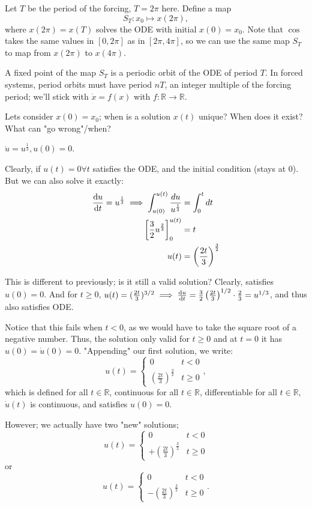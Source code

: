 \documentclass[12pt, oneside]{article}
\begin{document}
Let $T$ be the period of the forcing, $T = 2 \pi$ here. Define a map \[S_T: x_0 \mapsto x (2\pi),\] where $x(2 \pi) = x(T)$ solves the ODE with initial $x(0) = x_0$. Note that $\cos$ takes the same values in $[0, 2\pi]$ as in $[2\pi, 4\pi]$, so we can use the same map $S_T$ to map from $x(2 \pi)$ to $x(4 \pi)$.

A fixed point of the map $S_T$ is a periodic orbit of the ODE of period $T$. In forced systems, period orbits must have period $n T$, an integer multiple of the forcing period; we'll stick with $\dot{x} = f(x)$ with $f: \mathbb{R} \to \mathbb{R}$.

Lets consider $x(0) = x_0$; when is a solution $x(t)$ unique? When does it exist? What can "go wrong"/when?

\begin{example}\label{ex:bad1}
  $\dot{u} = u^{\frac{1}{3}}, u(0) = 0$. 
  
  Clearly, if $u(t) = 0 \forall t$ satisfies the ODE, and the initial condition (stays at 0). But we can also solve it exactly:
  \begin{align*}
    \dv{u}{t} = u^{\frac{1}{3}} \implies\int_{u(0)}^{u(t)} \frac{du}{u^{\frac{1}{3}}} &= \int_0^t dt\\
    \left[\frac{3}{2}u^{\frac{2}{3}}\right]_0^{u(t)} &= t\\
    u(t) &= \left(\frac{2t}{3}\right)^{\frac{3}{2}}
  \end{align*}

  This is different to previously; is it still a valid solution? Clearly, satisfies $u(0) = 0$. And for $t \geq 0$, $u(t) = (\frac{2t}{3})^{3/2} \implies \dv{u}{t} = \frac{3}{2}\left(\frac{2t}{3}\right)^{1/2}\cdot \frac{2}{3} = u^{1/3}$, and thus also satisfies ODE.

  Notice that this fails when $t < 0$, as we would have to take the square root of a negative number. Thus, the solution only valid for $t \geq 0$ and at $t = 0$ it has $u(0) = \dot{u}(0) = 0$. "Appending" our first solution, we write:
  \[u(t) = \begin{cases}
    0 & t < 0\\
    \left(\frac{2t}{3}\right)^{\frac{3}{2}} & t \geq 0
  \end{cases},\] which is defined for all $t \in \mathbb{R}$, continuous for all $t \in \mathbb{R}$, differentiable for all $t \in \mathbb{R}$, $\dot{u}(t)$ is continuous, and satisfies $u(0) = 0$.

  However; we actually have two "new" solutions; \[u(t) = \begin{cases}
    0 & t < 0\\
    +\left(\frac{2t}{3}\right)^{\frac{3}{2}} & t \geq 0
  \end{cases}\] or \[u(t) = \begin{cases}
    0 & t < 0\\
    -\left(\frac{2t}{3}\right)^{\frac{3}{2}} & t \geq 0
  \end{cases}.\]


\end{example}
\end{document}
